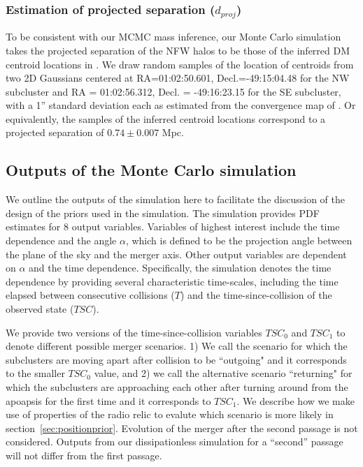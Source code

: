 \subsubsection{Estimation of projected separation ($d_{proj}$)} 
To be consistent with our MCMC mass inference, our Monte Carlo simulation takes 
the projected separation of the NFW halos to be those of the inferred
DM centroid locations in \citealt{Jee13}. We draw random samples
 of the location of centroids from two 2D Gaussians centered at
 RA=01:02:50.601, Decl.=-49:15:04.48 for the NW subcluster and RA =
 01:02:56.312, Decl. = -49:16:23.15 for the SE
subcluster, with a 1'' standard deviation each as estimated from the
convergence map of \citet{Jee13} . Or equivalently, the
samples of the inferred centroid locations correspond to a projected separation of
$0.74\pm {0.007}$ Mpc. 
\subsection{Outputs of the Monte Carlo simulation}\label{sec: outputs}
%

We outline the outputs of the simulation here to facilitate the discussion
of the design of the priors used in the simulation. The simulation
provides PDF estimates for 8 output variables. Variables
of highest interest include the time dependence and the angle $\alpha$, which is
defined to be the projection angle between the plane of the sky and the merger axis. Other output variables are dependent on $\alpha$ and the time
dependence. Specifically, the simulation denotes the time dependence by
providing several characteristic time-scales, including the time
elapsed between consecutive collisions
($T$) and the time-since-collision of the observed state ($TSC$).  

We provide two versions of the time-since-collision variables $TSC_0$ and
$TSC_1$ to denote different possible merger scenarios. 1) We call the scenario for which the subclusters are
moving apart after collision to be ``outgoing" and it corresponds to the
smaller $TSC_0$ value, and 2) we call the alternative scenario 
``returning" for which the subclusters are approaching each other after turning
around from the apoapsis for the first time and it corresponds to $TSC_1$.
We describe how we make use of properties of the radio relic to evalute
which scenario is more likely in
section~\ref{sec:positionprior}. Evolution of the merger after the second
passage is not considered. Outputs from our dissipationless simulation for
a ``second'' passage will not differ from the first passage.
 
